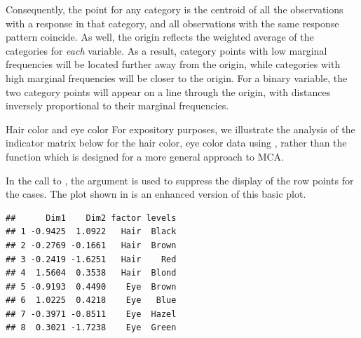 \documentclass[11pt]{book}
\renewenvironment{knitrout}{\small\renewcommand{\baselinestretch}{.85}}{} %
\begin{document}
Consequently, the point for any category is the centroid of all the
observations with a response in that category, and
all observations with the same response pattern coincide.
As well, the origin reflects the weighted average of the categories for
\emph{each} variable.  As a result, category points with low marginal
frequencies will be located further away from the origin,
while categories with high marginal frequencies will be closer to the
origin.
For a binary variable, the two category points will appear on a line
through the origin, with distances inversely proportional to their
marginal frequencies.

\begin{Example}[haireye4]{Hair color and eye color}
For expository purposes,
we illustrate the analysis of the indicator matrix below for the hair color,
eye color data using , rather than the function 
which is designed for a more general approach to MCA.

\begin{knitrout}
\color{fgcolor}\begin{kframe}
\begin{alltt}
 \hlkwb{<-} 
 \hlkwb{<-}  \hlstd{=}\hlstd{(}\hlstd{,} \hlstd{))}
\end{alltt}
\end{kframe}
\end{knitrout}
In the call to , the argument 
is used to suppress the display of the row points for the cases.
The plot shown in  is an enhanced
version of this basic plot.

\begin{knitrout}
\color{fgcolor}\begin{kframe}
\begin{verbatim}
##      Dim1    Dim2 factor levels
## 1 -0.9425  1.0922   Hair  Black
## 2 -0.2769 -0.1661   Hair  Brown
## 3 -0.2419 -1.6251   Hair    Red
## 4  1.5604  0.3538   Hair  Blond
## 5 -0.9193  0.4490    Eye  Brown
## 6  1.0225  0.4218    Eye   Blue
## 7 -0.3971 -0.8511    Eye  Hazel
## 8  0.3021 -1.7238    Eye  Green
\end{verbatim}
\end{kframe}\begin{figure}[!htbp]



\end{figure}
\end{knitrout}
\end{Example}
\end{document}
